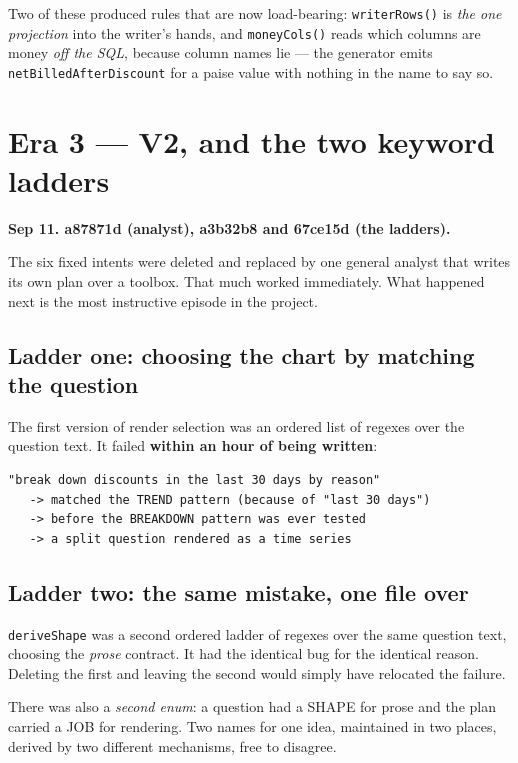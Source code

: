 \documentclass[11pt,a4paper]{report}
\newcommand{\code}[1]{\texttt{\small #1}}
\newcommand{\sha}[1]{{\ttfamily\small\color{slate}#1}}
\begin{document}
\noindent Two of these produced rules that are now load-bearing:
\code{writerRows()} is \emph{the one projection} into the writer's hands, and \code{moneyCols()}
reads which columns are money \emph{off the SQL}, because column names lie --- the generator emits
\code{netBilledAfterDiscount} for a paise value with nothing in the name to say so.

\section{Era 3 --- V2, and the two keyword ladders}
\label{sec:era3}

\textbf{Sep 11. \sha{a87871d} (analyst), \sha{a3b32b8} and \sha{67ce15d} (the ladders).}

The six fixed intents were deleted and replaced by one general analyst that writes its own plan
over a toolbox. That much worked immediately. What happened next is the most instructive episode
in the project.

\subsection{Ladder one: choosing the chart by matching the question}

The first version of render selection was an ordered list of regexes over the question text. It
failed \textbf{within an hour of being written}:

\begin{lstlisting}
"break down discounts in the last 30 days by reason"
   -> matched the TREND pattern (because of "last 30 days")
   -> before the BREAKDOWN pattern was ever tested
   -> a split question rendered as a time series
\end{lstlisting}

\subsection{Ladder two: the same mistake, one file over}

\code{deriveShape} was a second ordered ladder of regexes over the same question text, choosing
the \emph{prose} contract. It had the identical bug for the identical reason. Deleting the first
and leaving the second would simply have relocated the failure.

There was also a \emph{second enum}: a question had a SHAPE for prose and the plan carried a JOB
for rendering. Two names for one idea, maintained in two places, derived by two different
mechanisms, free to disagree.
\end{document}

